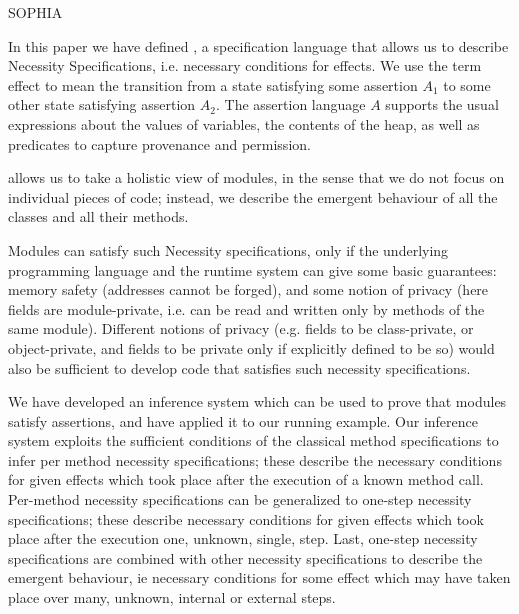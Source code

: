 
SOPHIA

In this paper we have defined \Chainmail, a specification language that allows us to
describe Necessity Specifications, i.e. necessary  conditions for effects.
We use the term  effect to mean the transition from a  state satisfying some assertion 
$A_1$ to some  other state satisfying  assertion $A_2$. 
The assertion language $A$ supports the usual expressions about the values of
variables, the contents of the heap, as well as predicates to capture provenance 
and permission.

\Chainmail allows us to take a holistic view of modules, in the sense that we do not focus
on individual pieces of code; instead, we  describe  the emergent behaviour of all
the classes and all their methods. 

Modules can satisfy such Necessity specifications, only if
the underlying programming language and the runtime system 
can give some basic guarantees:
 memory safety (addresses cannot be forged), 
and some notion of privacy (here fields are module-private, i.e. can be read and written only
by methods of the same module). Different notions of privacy 
(e.g. fields to be class-private,
or object-private, and fields to be private only if explicitly defined to be so)  would
also be sufficient to develop code that satisfies such necessity specifications.
 

We have developed an inference system which can be used to prove that modules satisfy  
\Chainmail assertions, and have applied it to our running example. 
Our inference system exploits the sufficient conditions of the classical
method specifications to infer per method necessity specifications;  
these describe the necessary conditions for given effects
which took place after the execution of a known method call. 
Per-method necessity specifications can be generalized to one-step
 necessity specifications; these describe necessary conditions for
 given effects  which took place after the execution one, 
 unknown, single, step. 
 Last, one-step
 necessity specifications are combined with other necessity specifications
 to describe the emergent behaviour, ie  necessary conditions for some effect which
 may have taken place over many, unknown, internal or external steps.
 

